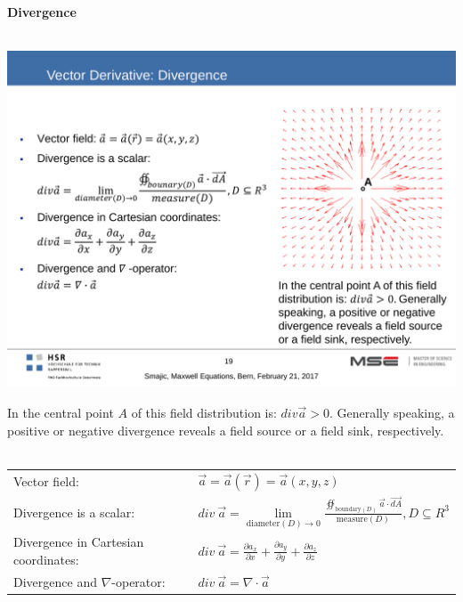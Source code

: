 \textbf{\\ \\ Divergence\\ \\}
\begin{minipage}[lt]{5cm}
	\includegraphics[width=.8\textwidth]{./images/Divergence.pdf}
\end{minipage}
\begin{minipage}[rt]{13cm}
	In the central point $A$ of this field distribution is: $div \vec{a} > 0$. Generally speaking, a positive or negative divergence reveals a field source or a field sink, respectively. \\ \\
	\begin{tabular}{ll}
		Vector field: & \(\displaystyle \vec{a} = \vec{a}\left(\vec{r}\right) = \vec{a}\left(x,y,z\right)\) \\
		Divergence is a scalar: & \(\displaystyle div~\vec{a} = \lim\limits_{\textrm{diameter}\left(D\right)\rightarrow 0} \frac{\oiint_{\textrm{boundary}\left(D\right)} \vec{a} \cdot \vec{dA}}{\textrm{measure}\left(D\right)}, D\subseteq R^3\) \\
		Divergence in Cartesian coordinates: & \(\displaystyle div~\vec{a} = \frac{\partial a_x}{\partial x} + \frac{\partial a_y}{\partial y} + \frac{\partial a_z}{\partial z} \)\\
		Divergence and $\nabla$-operator: & \(\displaystyle div~\vec{a} = \nabla \cdot \vec{a} \) \\
	\end{tabular}
\end{minipage}

